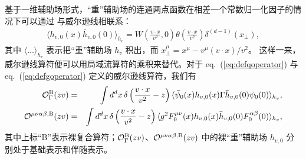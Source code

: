 基于一维辅助场形式，``重''辅助场的连通两点函数在相差一个常数归一化因子的情况下可以通过 \cite{Dorn:1986dt,Braun:2020ymy,Ji:2020ect} 与威尔逊线相联系：
\begin{eqnarray}
\langle h_{v,0}(x)\bar{h}_{v,0}(0) \rangle_{h_v} = W\left(\frac{v\cdot x}{v^2}, 0\right)\theta\left(\frac{v\cdot x}{v^2}\right)\delta^{(d-1)}(x_\perp),
\end{eqnarray}
其中 $\langle ... \rangle_{h_v}$ 表示把``重''辅助场 $h_v$ 积出，而 $x_{\perp}^{\mu} = x^{\mu} - v^{\mu}(v\cdot x)/v^2$。
这样一来，威尔逊线算符便可以用局域流算符的乘积来替代。对于 eq.~(\ref{eq:defqoperator}) 与 eq.~(\ref{eq:defgoperator}) 定义的威尔逊线算符，我们有
\begin{eqnarray}
\mathcal{O}^{\rm B}_{\Gamma}(zv)  &=& \int d^d x\, \delta\left(\frac{v\cdot x}{v^2} -z\right)\langle \bar{\psi}_{0}(x)h_{v,0}(x) \Gamma \bar{h}_{v,0}(0)\psi_0(0)\rangle_{h_v},\\
\mathcal{O}^{\mu\nu\alpha\beta, \rm B}(zv)  &=& \int d^d x\, \delta\left(\frac{v\cdot x}{v^2} -z\right)\langle g^2F_{0}^{\mu\nu}(x)h_{v,0}(x)  \bar{h}_{v,0}(0)F_{0}^{\alpha\beta}(0)\rangle_{h_v},
\end{eqnarray}
其中上标``B''表示裸复合算符；$\mathcal{O}^{\rm B}_{\Gamma}(zv)$、$\mathcal{O}^{\mu\nu\alpha\beta, \rm B}(zv)$ 中的裸``重''辅助场 $h_{v,0}$ 分别处于基础表示和伴随表示。


